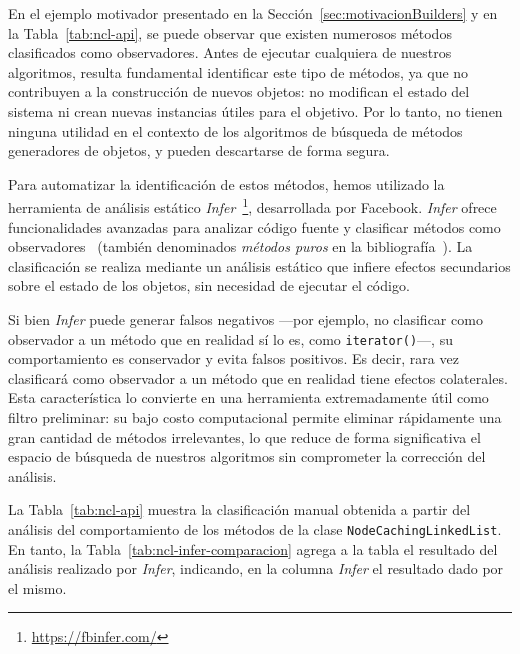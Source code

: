 En el ejemplo motivador presentado en la Sección~\ref{sec:motivacionBuilders} y en la Tabla~\ref{tab:ncl-api}, se puede observar que existen numerosos métodos clasificados como observadores. 
Antes de ejecutar cualquiera de nuestros algoritmos, resulta fundamental identificar este tipo de métodos, ya que no contribuyen a la construcción de nuevos objetos: no modifican el estado del sistema ni crean nuevas instancias útiles para el objetivo. 
Por lo tanto, no tienen ninguna utilidad en el contexto de los algoritmos de búsqueda de métodos generadores de objetos, y pueden descartarse de forma segura.

Para automatizar la identificación de estos métodos, hemos utilizado la herramienta de análisis estático \emph{Infer}~\footnote{\url{https://fbinfer.com/}}, desarrollada por Facebook. 
\emph{Infer} ofrece funcionalidades avanzadas para analizar código fuente y clasificar métodos como observadores~\cite{Huang:2012} (también denominados \emph{métodos puros} en la bibliografía~\cite{Salcianu:2005}).
La clasificación se realiza mediante un análisis estático que infiere efectos secundarios sobre el estado de los objetos, sin necesidad de ejecutar el código.

Si bien \emph{Infer} puede generar falsos negativos —por ejemplo, no clasificar como observador a un método que en realidad sí lo es, como \texttt{iterator()}—, su comportamiento es conservador y evita falsos positivos. 
Es decir, rara vez clasificará como observador a un método que en realidad tiene efectos colaterales. 
Esta característica lo convierte en una herramienta extremadamente útil como filtro preliminar: su bajo costo computacional permite eliminar rápidamente una gran cantidad de métodos irrelevantes, 
lo que reduce de forma significativa el espacio de búsqueda de nuestros algoritmos sin comprometer la corrección del análisis.

La Tabla~\ref{tab:ncl-api} muestra la clasificación manual obtenida a partir del análisis del comportamiento de los métodos de la clase \texttt{NodeCachingLinkedList}.
En tanto, la Tabla~\ref{tab:ncl-infer-comparacion} agrega a la tabla el resultado del análisis realizado por \emph{Infer}, indicando, en la columna \emph{Infer} el resultado dado por el mismo.

